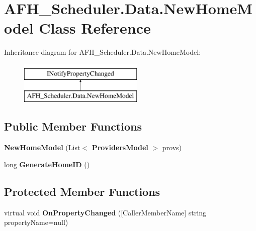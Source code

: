 \section{A\+F\+H\+\_\+\+Scheduler.\+Data.\+New\+Home\+Model Class Reference}
\label{class_a_f_h___scheduler_1_1_data_1_1_new_home_model}
Inheritance diagram for A\+F\+H\+\_\+\+Scheduler.\+Data.\+New\+Home\+Model\+:\begin{figure}[H]
\begin{center}
\leavevmode
\includegraphics[height=2.000000cm]{class_a_f_h___scheduler_1_1_data_1_1_new_home_model}
\end{center}
\end{figure}
\subsection*{Public Member Functions}
\begin{DoxyCompactItemize}
\item 
\mbox{\label{class_a_f_h___scheduler_1_1_data_1_1_new_home_model_ae003d209c891ae7eb437479e8a3960f3}} 
{\bfseries New\+Home\+Model} (List$<$ \textbf{ Providers\+Model} $>$ provs)
\item 
\mbox{\label{class_a_f_h___scheduler_1_1_data_1_1_new_home_model_a29f78d92e18a7f0e1b67d44c397e1484}} 
long {\bfseries Generate\+Home\+ID} ()
\end{DoxyCompactItemize}
\subsection*{Protected Member Functions}
\begin{DoxyCompactItemize}
\item 
\mbox{\label{class_a_f_h___scheduler_1_1_data_1_1_new_home_model_a615f105c480c0818b969132492e2b7e6}} 
virtual void {\bfseries On\+Property\+Changed} ([Caller\+Member\+Name] string property\+Name=null)
\end{DoxyCompactItemize}
